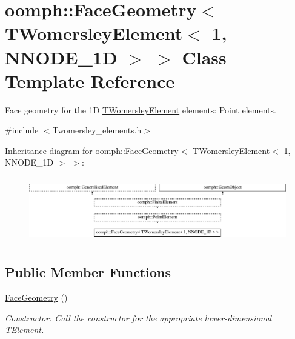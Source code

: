 \hypertarget{classoomph_1_1FaceGeometry_3_01TWomersleyElement_3_011_00_01NNODE__1D_01_4_01_4}{}\section{oomph\+:\+:Face\+Geometry$<$ T\+Womersley\+Element$<$ 1, N\+N\+O\+D\+E\+\_\+1D $>$ $>$ Class Template Reference}
\label{classoomph_1_1FaceGeometry_3_01TWomersleyElement_3_011_00_01NNODE__1D_01_4_01_4}


Face geometry for the 1D \hyperlink{classoomph_1_1TWomersleyElement}{T\+Womersley\+Element} elements\+: Point elements.  




{\ttfamily \#include $<$Twomersley\+\_\+elements.\+h$>$}

Inheritance diagram for oomph\+:\+:Face\+Geometry$<$ T\+Womersley\+Element$<$ 1, N\+N\+O\+D\+E\+\_\+1D $>$ $>$\+:\begin{figure}[H]
\begin{center}
\leavevmode
\includegraphics[height=2.864450cm]{classoomph_1_1FaceGeometry_3_01TWomersleyElement_3_011_00_01NNODE__1D_01_4_01_4}
\end{center}
\end{figure}
\subsection*{Public Member Functions}
\begin{DoxyCompactItemize}
\item 
\hyperlink{classoomph_1_1FaceGeometry_3_01TWomersleyElement_3_011_00_01NNODE__1D_01_4_01_4_a6db1b1f549675de60e0847709a2b925a}{Face\+Geometry} ()
\begin{DoxyCompactList}\small\item\em Constructor\+: Call the constructor for the appropriate lower-\/dimensional \hyperlink{classoomph_1_1TElement}{T\+Element}. \end{DoxyCompactList}\end{DoxyCompactItemize}
